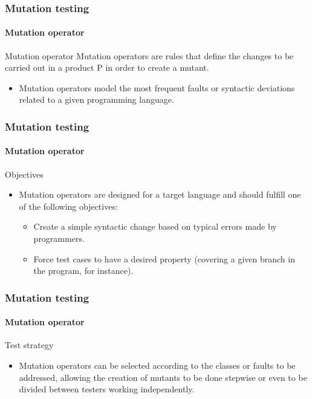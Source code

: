 \begin{frame}[parent={concept:mutation-testing}, hasprev=false, hasnext=true]
\frametitle{Mutation testing}
\framesubtitle{Mutation operator}
\label{concept:mutation-operator}

\begin{block:concept}{Mutation operator}
Mutation operators are rules that define the changes to be carried out in a
product P in order to create a mutant.
\end{block:concept}

\begin{block:fact}{}
\begin{itemize}
	\item Mutation operators model the most frequent faults or syntactic
	deviations related to a given programming language.
\end{itemize}
\end{block:fact}
\end{frame}


\begin{frame}[hasprev=true, hasnext=true]
\frametitle{Mutation testing}
\framesubtitle{Mutation operator}

\begin{block:fact}{Objectives}
\begin{itemize}
	\item Mutation operators are designed for a target language and should
	fulfill one of the following objectives:
	\begin{itemize}
		\item Create a simple syntactic change based on typical errors made by
		programmers.

		\item Force test cases to have a desired property (covering a given
		branch in the program, for instance).
	\end{itemize}
\end{itemize}
\end{block:fact}
\end{frame}


\begin{frame}[hasprev=true, hasnext=true]
\frametitle{Mutation testing}
\framesubtitle{Mutation operator}

\begin{block:fact}{Test strategy}
\begin{itemize}
	\item Mutation operators can be selected according to the classes or faults
	to be addressed, allowing the creation of mutants to be done stepwise or
	even to be divided between testers working independently.
\end{itemize}
\end{block:fact}
\end{frame}